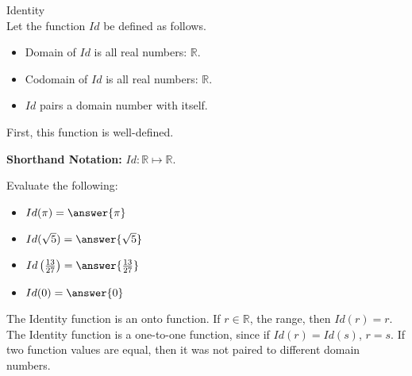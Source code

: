 \documentclass{ximera}
\begin{document}
\begin{example} Identity \\

Let the function $Id$ be defined as follows.


\begin{itemize}
\item Domain of $Id$ is all real numbers: $\mathbb{R}$.
\item Codomain of $Id$ is all real numbers: $\mathbb{R}$.
\item $Id$ pairs a domain number with itself.
\end{itemize}


First, this function is well-defined.


\textbf{Shorthand Notation: } $Id: \mathbb{R} \mapsto \mathbb{R}$.

\begin{question}
Evaluate the following:

\begin{itemize}
	\item $Id(\pi) = \answer{\pi}$
	\item $Id(\sqrt{5}) = \answer{\sqrt{5}}$
	\item $Id\left(\frac{13}{27}\right) = \answer{\frac{13}{27}}$
	\item $Id(0) = \answer{0}$
\end{itemize}

\end{question}





The Identity function is an onto function.  If $r \in \mathbb{R}$, the range, then $Id(r) = r$. \\


The Identity function is a one-to-one function, since if $Id(r)=Id(s)$, $r = s$.  If two function values are equal, then it was not paired to different domain numbers.





\end{example}
\end{document}
